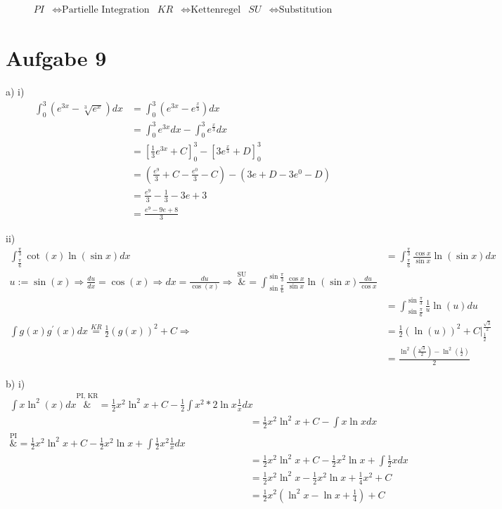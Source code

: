 \documentclass[10pt]{article}
\begin{document}
\thispagestyle{fancy}
\begin{align*}
	PI &\Leftrightarrow \text{Partielle Integration} &
	KR &\Leftrightarrow \text{Kettenregel} &
	SU &\Leftrightarrow \text{Substitution}
\end{align*}
\section*{Aufgabe 9}
\par{a) i)}
\begin{align*}
	\int_0^3 \left(e^{3x} - \sqrt[3]{e^x} \right) dx
	&= \int_0^3 \left(e^{3x} - e^{\frac x3} \right) dx \\
	&= \int_0^3 e^{3x} dx - \int_0^3 e^{\frac x3} dx \\
	&= \left[ \frac13 e^{3x} + C \right]_0^3 -
	\left[3 e^{\frac x 3} + D \right]_0^3 \\
	&= \left( \frac{e^9}{3} + C - \frac{e^0}{3} - C \right) -
	\left(3e + D - 3e^0 - D \right) \\
	&= \frac{e^9}{3} - \frac13 - 3e + 3 \\
	&= \frac{e^9 - 9e +8}{3}
\end{align*}
\par{ii)}
\begin{align*}
	\int_{\frac\pi6}^{\frac\pi3} \cot(x) \ln(\sin x) dx
	&= \int_{\frac\pi6}^{\frac\pi3} 
	\frac{\cos x}{\sin x} \ln(\sin x) dx \\
	u := \sin(x) \Rightarrow \frac{du}{dx} = \cos(x) 
	\Rightarrow dx = \frac{du}{\cos(x)}
	\Rightarrow \
	\overset{\text{SU}}&{=}
	\int_{\sin\frac\pi6}^{\sin\frac\pi3} 
	\frac{\cos x}{\sin x} \ln(\sin x) \frac{du}{\cos x} \\
	&= \int_{\sin\frac\pi6}^{\sin\frac\pi3}
	\frac1{u} \ln(u) du \\
	\int g(x) g^\prime(x) dx \overset{KR}{=} 
	\frac12\left(g(x)\right)^2 + C
	\Rightarrow \
	&= \frac12 \left(\ln(u)\right)^2 + C 
	\vert_{\frac12}^{\frac{\sqrt{3}}{2}} \\
	&= \frac{\ln^2\left(\frac{\sqrt{3}}{2}\right) 
	- \ln^2\left(\frac12\right)}{2}
\end{align*}
\newpage
\setlength{\headheight}{0cm}
\par{b) i)}
\begin{align*}
	\int x \ln^2(x) dx 
	\overset{\text{PI, KR}}&{=} 
	\frac12 x^2 \ln^2x + C - 
	\frac12 \int x^2 * 2\ln x \frac1x dx \\
	&= \frac12 x^2 \ln^2x + C - \int x \ln x dx \\
	\overset{\text{PI}}&{=}
	\frac12 x^2 \ln^2x + C - \frac12 x^2 \ln x 
	+ \int \frac12 x^2 \frac1x dx \\
	&=  \frac12 x^2 \ln^2x + C - \frac12 x^2 \ln x
	+ \int \frac12 x dx \\
	&=  \frac12 x^2 \ln^2x  - \frac12 x^2 \ln x
	+ \frac14 x^2  + C\\
	&= \frac12 x^2
	\left(\ln^2x - \ln x + \frac14\right) + C
\end{align*}
\end{document}
